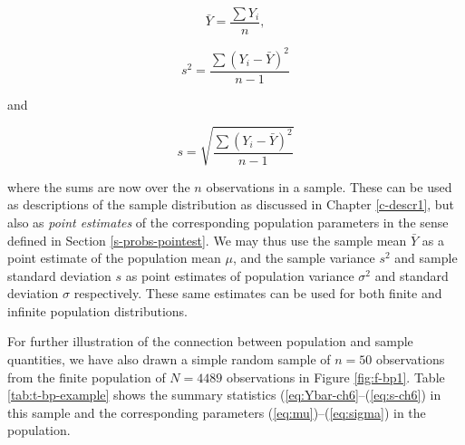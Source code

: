 \documentclass[11pt,a4paper,openany]{book}
\begin{document}
\begin{equation}\bar{Y}=\frac{\sum Y_{i}}{n}, \label{eq:Ybar-ch6}\end{equation}

\begin{equation}s^{2} = \frac{\sum (Y_{i}-\bar{Y})^{2}}{n-1}\label{eq:s2-ch6}\end{equation}

and

\begin{equation}s = \sqrt{\frac{\sum (Y_{i}-\bar{Y})^{2}}{n-1}}\label{eq:s-ch6}\end{equation}

where the sums are now over the \(n\) observations in a sample. These
can be used as descriptions of the sample distribution as discussed in
Chapter \ref{c-descr1}, but also as \emph{point estimates} of the
corresponding population parameters in the sense defined in Section
\ref{s-probs-pointest}. We may thus use the sample mean \(\bar{Y}\) as a
point estimate of the population mean \(\mu\), and the sample variance
\(s^{2}\) and sample standard deviation \(s\) as point estimates of
population variance \(\sigma^{2}\) and standard deviation \(\sigma\)
respectively. These same estimates can be used for both finite and
infinite population distributions.

For further illustration of the connection between population and sample
quantities, we have also drawn a simple random sample of \(n=50\)
observations from the finite population of \(N=4489\) observations in
Figure \ref{fig:f-bp1}. Table \ref{tab:t-bp-example} shows the summary
statistics (\ref{eq:Ybar-ch6}--(\ref{eq:s-ch6}) in this sample and the
corresponding parameters (\ref{eq:mu})--(\ref{eq:sigma}) in the
population.
\end{document}
